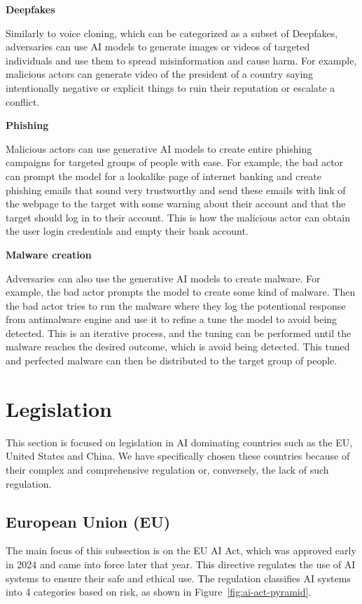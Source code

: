 \textbf{Deepfakes}

Similarly to voice cloning, which can be categorized as a subset of Deepfakes, adversaries can use AI models to generate images or videos of targeted individuals and use them to spread misinformation and cause harm. For example, malicious actors can generate video of the president of a country saying intentionally negative or explicit things to ruin their reputation or escalate a conflict.

\textbf{Phishing}

Malicious actors can use generative AI models to create entire phishing campaigns for targeted groups of people with ease. For example, the bad actor can prompt the model for a lookalike page of internet banking and create phishing emails that sound very trustworthy and send these emails with link of the webpage to the target with some warning about their account and that the target should log in to their account. This is how the malicious actor can obtain the user login credentials and empty their bank account.

\textbf{Malware creation}

Adversaries can also use the generative AI models to create malware. For example, the bad actor prompts the model to create some kind of malware. Then the bad actor tries to run the malware where they log the potentional response from antimalware engine and use it to refine a tune the model to avoid being detected. This is an iterative process, and the tuning can be performed until the malware reaches the desired outcome, which is avoid being detected. This tuned and perfected malware can then be distributed to the target group of people.


\section{Legislation} \label{sec:legislation}

This section is focused on legislation in AI dominating countries such as the EU, United States and China. We have specifically chosen these countries because of their complex and comprehensive regulation or, conversely, the lack of such regulation.

\subsection{European Union (EU)}
The main focus of this subsection is on the EU AI Act\cite{eu_ai_act_2024}, which was approved early in 2024 and came into force later that year. This directive regulates the use of AI systems to ensure their safe and ethical use. The regulation classifies AI systems into 4 categories based on risk, as shown in Figure~\ref{fig:ai-act-pyramid}.

